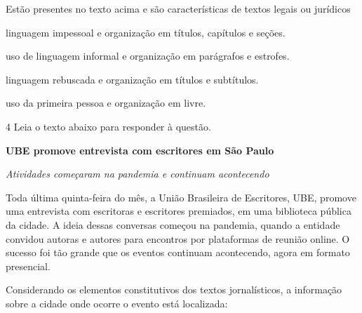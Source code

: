 Estão presentes no texto acima e são características de textos legais ou
jurídicos

\begin{escolha}

\item linguagem impessoal e organização em títulos, capítulos e seções.
\item uso de linguagem informal e organização em parágrafos e estrofes.
\item linguagem rebuscada e organização em títulos e subtítulos.
\item uso da primeira pessoa e organização em livre.

\end{escolha}

\num{4} Leia o texto abaixo para responder à questão. 

\begin{myquote}

\textbf{UBE promove entrevista com escritores em São Paulo}

\textit{Atividades começaram na pandemia e continuam acontecendo}

Toda última quinta-feira do mês, a União Brasileira de Escritores, UBE,
promove uma entrevista com escritoras e escritores premiados, em uma
biblioteca pública da cidade. A ideia dessas conversas começou na pandemia,
quando a entidade convidou autoras e autores para encontros por plataformas de
reunião online. O sucesso foi tão grande que os eventos continuam acontecendo,
agora em formato presencial.




\end{myquote}

Considerando os elementos constitutivos dos textos jornalísticos, a
informação sobre a cidade onde ocorre o evento está localizada:

